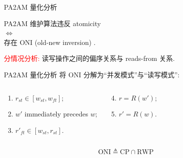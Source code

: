 \begin{frame}{PA2AM 量化分析}

  \pause
  \vspace{0.10cm}

  \begin{ctheorem}[充要条件]
	\begin{center}
	  PA2AM 维护算法违反 atomicity\\
	  $\iff$\\
	  存在 ONI (old-new inversion) .
	\end{center}
	\vspace{-0.50cm}
  \end{ctheorem}

  \begin{cproof}
	\textcolor{red}{分情况分析:} 读写操作之间的偏序关系与 reads-from 关系.
  \end{cproof}
\end{frame}
\begin{frame}{PA2AM 量化分析}
  将 ONI 分解为``并发模式''与``读写模式'':

  \begin{columns}
	  \begin{cdef}
		\begin{enumerate}
		  \item $r_{st} \in [w_{st}, w_{ft}]$;
		  \item $w'$ immediately precedes $w$;
		  \item $r'_{ft} \in [w_{st}, r_{st}]$.
		\end{enumerate}
	  \end{cdef}
	  \begin{cdef}
		\begin{enumerate}
		  \setcounter{enumi}{3}
		  \item $r = R(w')$;
		  \item $r' = R(w)$.
		\end{enumerate}
	  \end{cdef}
  \end{columns}

  \vspace{0.60cm}

  \[
	\textrm{ONI} \triangleq \textrm{CP}  \cap \textrm{RWP}
  \]
\end{frame}
